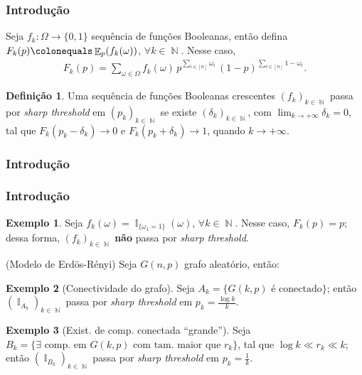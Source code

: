 \documentclass[12pt]{beamer}
\theoremstyle{definition} %
\newtheorem{mydef}{Definição}
\newtheorem{myexp}{Exemplo}
\DeclareMathOperator{\EX}{\mathbb{E}} %
\DeclareMathOperator{\NX}{\mathbb{N}} %
\DeclareMathOperator{\IX}{\mathbb{I}} %
\begin{document}
	\begin{frame}[t]
		\frametitle{Introdução}
		Seja $f_k: \Omega \longrightarrow \{0,1\}$ sequência de funções Booleanas, então defina $F_k(p) \colonequals \EX_p(f_k(\omega))$, $\forall k \in \NX$. Nesse caso,
		\begin{align}\label{eq-sharp-threshold}
			F_k(p) = \sum_{\omega \in \Omega} f_k(\omega) \, p^{\sum_{i \in [n]} \omega_i} \, (1 - p)^{\sum_{i \in [n]} 1 - \omega_i}.
		\end{align}
		\pause
		\begin{mydef}
			Uma sequência de funções Booleanas crescentes $(f_k)_{k \in \NX}$ passa por \textit{sharp threshold} em $(p_k)_{k \in \NX}$ se existe $(\delta_k)_{k \in \NX}$, com $\lim_{k \rightarrow +\infty} \delta_k = 0$, tal que $F_k(p_k - \delta_k) \longrightarrow 0$ e $F_k(p_k + \delta_k) \longrightarrow 1$, quando $k \rightarrow +\infty$.
		\end{mydef}
	\end{frame}

	\begin{frame}[t]
		\frametitle{Introdução}
		
	\end{frame}

	\begin{frame}[t]
		\frametitle{Introdução}
		\begin{myexp}
			Seja $f_k(\omega) = \IX_{\{\omega_1 = 1\}}(\omega)$, $\forall k \in \NX$. Nesse caso, $F_k(p) = p$; dessa forma, $(f_k)_{k \in \NX}$ \textbf{não} passa por \textit{sharp threshold}.
		\end{myexp}
		\pause
		\vspace{-8pt}
		(Modelo de Erd\"os-Rényi) Seja $G(n,p)$ grafo aleatório, então:
		\begin{myexp}[Conectividade do grafo]
			Seja $A_k = \{G(k, p) \text{ é conectado}\}$; então $(\IX_{A_k})_{k \in \NX}$ passa por \textit{sharp threshold} em $p_k = \frac{\log k}{k}$.
			\label{ex-grafo-1}
		\end{myexp}
		\pause
		\begin{myexp}[Exist. de comp. conectada ``grande'']
			Seja $B_k = \{\exists \text{ comp. em } G(k, p) \text{ com tam. maior que } r_k\}$, tal que $\log k \ll r_k \ll k$; então $(\IX_{B_k})_{k \in \NX}$ passa por \textit{sharp threshold} em $p_k = \frac{1}{k}$.
			\label{ex-grafo-2}
		\end{myexp}
	\end{frame}
\end{document}
